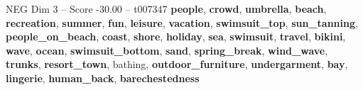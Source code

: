 \begin{textsample}{NEG Dim 3 – Score -30.00 – t007347}  \label{ex:f3_neg_004}
\textbf{people}, \textbf{crowd}, \textbf{umbrella}, \textbf{beach}, \textbf{recreation}, \textbf{summer}, \textbf{fun}, \textbf{leisure}, \textbf{vacation}, \textbf{swimsuit\_top}, \textbf{sun\_tanning}, \textbf{people\_on\_beach}, \textbf{coast}, \textbf{shore}, \textbf{holiday}, \textbf{sea}, \textbf{swimsuit}, \textbf{travel}, \textbf{bikini}, \textbf{wave}, \textbf{ocean}, \textbf{swimsuit\_bottom}, \textbf{sand}, \textbf{spring\_break}, \textbf{wind\_wave}, \textbf{trunks}, \textbf{resort\_town}, bathing, \textbf{outdoor\_furniture}, \textbf{undergarment}, \textbf{bay}, \textbf{lingerie}, \textbf{human\_back}, \textbf{barechestedness}

\end{textsample}
